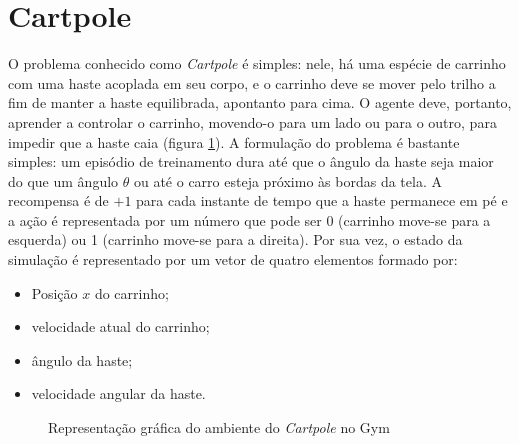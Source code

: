 \documentclass[cic,tc]{iiufrgs}
\begin{document}
\section{Cartpole}
O problema conhecido como \textit{Cartpole} \cite{Cartpole83} é simples: nele,
há uma espécie de carrinho com uma haste acoplada em seu corpo, e o carrinho
deve se mover pelo trilho a fim de manter a haste equilibrada, apontanto para
cima. O agente deve, portanto, aprender a controlar o carrinho, movendo-o para
um lado ou para o outro, para impedir que a haste caia (figura \ref{fig:cartpole_openai}).
A formulação do problema é bastante simples: um episódio de treinamento dura
até que o ângulo da haste seja maior do que um ângulo $\theta$ ou até o carro
esteja próximo às bordas da tela.
A recompensa é de $+1$ para cada instante de tempo que a haste permanece em pé
e a ação é representada por um número que pode ser 0 (carrinho move-se para a
esquerda) ou 1 (carrinho move-se para a direita). Por sua vez, o estado da
simulação é representado por um vetor de quatro elementos formado por:

\begin{itemize}
  \item Posição $x$ do carrinho;
  \item velocidade atual do carrinho;
  \item ângulo da haste;
  \item velocidade angular da haste.
\end{itemize}


\begin{figure}[h!]
  \begin{center}
  \caption{Representação gráfica do ambiente do \textit{Cartpole} no Gym}
  \label{fig:cartpole_openai}
\end{center}
\end{figure}
\end{document}
